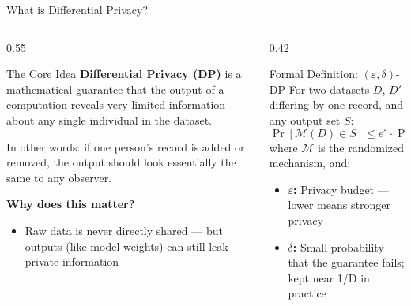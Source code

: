 \documentclass[aspectratio=169]{beamer}
\begin{document}
\begin{frame}{What is Differential Privacy?}
    \begin{columns}[T]
        \begin{column}{0.55\textwidth}
            \begin{block}{The Core Idea}
                \textbf{Differential Privacy (DP)} is a mathematical guarantee that the output of a computation reveals very limited information about any single individual in the dataset.
                
                \vspace{0.2cm}
                In other words: if one person's record is added or removed, the output should look essentially the same to any observer.
            \end{block}
            \vspace{0.3cm}
            \textbf{Why does this matter?}
            \begin{itemize}
                \item Raw data is never directly shared — but outputs (like model weights) can still leak private information
                
            \end{itemize}
        \end{column}
        \begin{column}{0.42\textwidth}
            \begin{block}{Formal Definition: $(\varepsilon, \delta)$-DP}
                For two datasets $D$, $D'$ differing by one record, and any output set $S$:
                \[
                    \Pr[\mathcal{M}(D) \in S] \leq e^{\varepsilon} \cdot \Pr[\mathcal{M}(D') \in S] + \delta
                \]
                where $\mathcal{M}$ is the randomized mechanism, and:
                \begin{itemize}
                    \item \textbf{$\varepsilon$:} Privacy budget — lower means stronger privacy
                    \item \textbf{$\delta$:} Small probability that the guarantee fails; kept near 1/D in practice
                \end{itemize}
            \end{block}
        \end{column}
    \end{columns}
\end{frame}
\end{document}
